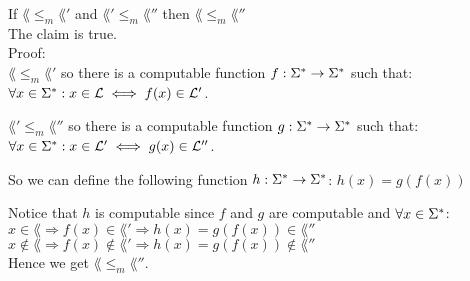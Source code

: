 If $\lang \leq_m \lang'$ and $\lang' \leq_m \lang''$ then $\lang \leq_m \lang''$ \\
The claim is true. \\

Proof: \\
$\lang \leq_m \lang'$  so there is a computable function  $f: \Sigma^* \rightarrow \Sigma^*$ such that: \\
$\forall x \in \Sigma^*: x \in \mathcal{L}  \iff f(x) \in \mathcal{L}'$.

$\lang'\leq_m \lang''$ so there is a computable function $g: \Sigma^* \rightarrow \Sigma^*$ such that: \\
$\forall x \in \Sigma^*: x \in \mathcal{L}' \iff g(x) \in \mathcal{L}''$.

So we can define the following function $h: \Sigma^* \rightarrow \Sigma^*$:
$h(x) = g(f(x))$

Notice that $h$ is computable since $f$ and $g$ are computable and $\forall x \in \Sigma^*$: \\
$x \in    \lang \Rightarrow f(x) \in    \lang' \Rightarrow h(x) = g(f(x)) \in    \lang''$ \\
$x \notin \lang \Rightarrow f(x) \notin \lang' \Rightarrow h(x) = g(f(x)) \notin \lang''$ \\

Hence we get $\lang \leq_m \lang''$. \\
